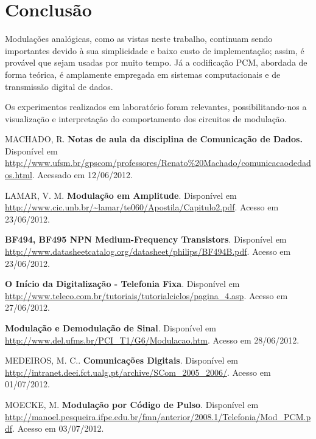 \documentclass[]{report}
\begin{document}
\chapter{Conclusão}
Modulações analógicas, como as vistas neste trabalho, continuam sendo importantes devido à sua simplicidade e baixo custo de implementação; assim, é provável que sejam usadas por muito tempo. Já a codificação PCM, abordada de forma teórica, é amplamente empregada em sistemas computacionais e de transmissão digital de dados.

Os experimentos realizados em laboratório foram relevantes, possibilitando-nos a visualização e interpretação do comportamento dos circuitos de modulação.


\begin{thebibliography}{100}
 MACHADO, R. 
 \textbf{Notas de aula da disciplina de Comunicação de Dados.}
 Disponível em \url{http://www.ufsm.br/gpscom/professores/Renato\%20Machado/comunicacaodedados.html}. Acessado em 12/06/2012.
 
LAMAR, V. M. \textbf{Modulação em Amplitude}. Disponível em \url{http://www.cic.unb.br/~lamar/te060/Apostila/Capitulo2.pdf}. Acesso em 23/06/2012.

 
\textbf{BF494, BF495 NPN Medium-Frequency Transistors}. Disponível em \url{http://www.datasheetcatalog.org/datasheet/philips/BF494B.pdf}. Acesso em 23/06/2012.

\textbf{O Início da Digitalização - Telefonia Fixa}. Disponível em \url{http://www.teleco.com.br/tutoriais/tutorialciclos/pagina_4.asp}. Acesso em 27/06/2012.

\textbf{Modulação e Demodulação de Sinal}. Disponível em \url{http://www.del.ufms.br/PCI_T1/G6/Modulacao.htm}. Acesso em 28/06/2012.

MEDEIROS, M. C.. \textbf{Comunicações Digitais}. Disponível em \url{http://intranet.deei.fct.ualg.pt/archive/SCom_2005_2006/}. Acesso em 01/07/2012.

MOECKE, M. \textbf{Modulação por Código de Pulso}. Disponível em \url{http://manoel.pesqueira.ifpe.edu.br/fmn/anterior/2008.1/Telefonia/Mod_PCM.pdf}. Acesso em 03/07/2012.
\end{thebibliography}
\end{document}
